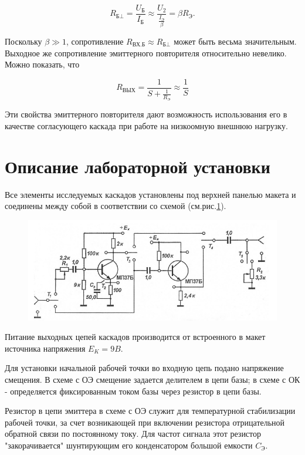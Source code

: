 $$R_{\text{Б} \bot}=\frac{U_{\text{Б}}}{I_{\text{Б}}} \approx \frac{U_2}{ \frac{ I_{ \text{Э} } }{\beta}}=\beta R_{\text{Э}}.$$

Поскольку $\beta \gg 1$, сопротивление  $R_{\text{ВХ.Б}} \approx R_{\text{Б} \bot}$ может быть весьма значительным. Выходное же сопротивление эмиттерного повторителя относительно невелико. Можно показать, что

$$R_{\text{ВЫХ}}=\frac{1}{S+\frac{1}{R_{\text{Э}}}} \approx \frac{1}{S}$$

Эти свойства эмиттерного повторителя дают возможность использования его в качестве согласующего каскада при работе на низкоомную внешнюю нагрузку.

\section{Описание лабораторной установки}
Все элементы исследуемых каскадов установлены под верхней панелью макета и соединены между собой в соответствии со схемой (см.рис.\ref{fig:7}).

\begin{figure}[h!]
	\centering
	\includegraphics[width=\linewidth]{fig/fig7}
	\caption{}
	\label{fig:7}
\end{figure}

Питание выходных цепей каскадов производится от встроенного в макет источника напряжения $E_K=9B$.

Для установки начальной рабочей точки во входную цепь подано напряжение смещения. В схеме с ОЭ смещение задается делителем в цепи базы; в схеме с ОК - определяется фиксированным током базы через резистор в цепи базы.

Резистор в цепи эмиттера в схеме с ОЭ служит для температурной стабилизации рабочей точки, за счет возникающей при включении резистора отрицательной обратной связи по постоянному току. Для частот сигнала этот резистор "закорачивается" шунтирующим его конденсатором большой емкости $C_{\text{Э}}$.


